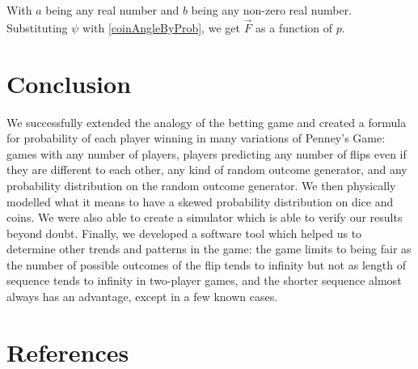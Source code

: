\documentclass[english,12pt,a4paper,final]{article}
\begin{document}
With $a$ being any real number and $b$ being any non-zero real number. Substituting $\psi$ with \eqref{coinAngleByProb}, we get $\vec{F}$ as a function of $p$.

\part {Conclusion}

We successfully extended the analogy of the betting game and created a formula for probability of each player winning in many variations of Penney's Game: games with any number of players, players predicting any number of flips even if they are different to each other, any kind of random outcome generator, and any probability distribution on the random outcome generator. We then physically modelled what it means to have a skewed probability distribution on dice and coins. We were also able to create a simulator which is able to verify our results beyond doubt. Finally, we developed a software tool which helped us to determine other trends and patterns in the game: the game limits to being fair as the number of possible outcomes of the flip tends to infinity but not as length of sequence tends to infinity in two-player games, and the shorter sequence almost always has an advantage, except in a few known cases.

\part {References}
\printbibliography[heading=none]
\end{document}
